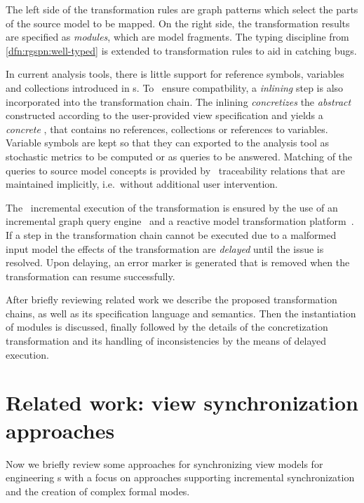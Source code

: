 The left side of the transformation rules are graph patterns which select the parts of the source model to be mapped. On the right side, the transformation results are specified as \emph{ modules}, which are  model fragments. The typing discipline from \vref{dfn:rgspn:well-typed} is extended to transformation rules to aid in catching bugs.

In current analysis tools, there is little support for reference symbols, variables and collections introduced in s. To ~ensure compatbility, a \emph{inlining} step is also incorporated into the transformation chain. The inlining \emph{concretizes} the \emph{abstract}  constructed according to the user-provided view specification and yields a \emph{concrete} , that contains no references, collections or references to variables. Variable symbols are kept so that they can exported to the analysis tool as stochastic metrics to be computed or as queries to be answered. Matching of the queries to source model concepts is provided by ~traceability relations that are maintained implicitly, i.e.~without additional user intervention.

The ~incremental execution of the transformation is ensured by the use of an incremental graph query engine~\citep{Ujhelyi15incquery} and a reactive model transformation platform~\citep{Bergmann15viatra}. If a step in the transformation chain cannot be executed due to a malformed input model the effects of the transformation are \emph{delayed} until the issue is resolved. Upon delaying, an error marker is generated that is removed when the transformation can resume successfully.

After briefly reviewing related work we describe the proposed transformation chains, as well as its specification language and semantics. Then the instantiation of  modules is discussed, finally followed by the details of the concretization transformation and its handling of inconsistencies by the means of delayed execution.

\section{Related work: view synchronization approaches}
\label{chap:transform:relwork}

Now we briefly review some approaches for synchronizing view models for engineering s with a focus on approaches supporting incremental synchronization and the creation of complex formal modes.

